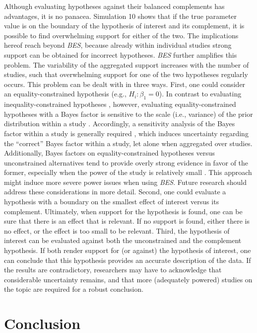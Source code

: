 \documentclass[
]{article}
\begin{document}
Although evaluating hypotheses against their balanced complements has
advantages, it is no panacea. Simulation 10 shows that if the true
parameter value is on the boundary of the hypothesis of interest and its
complement, it is possible to find overwhelming support for either of
the two. The implications hereof reach beyond \emph{BES}, because
already within individual studies strong support can be obtained for
incorrect hypotheses. \emph{BES} further amplifies this problem. The
variability of the aggregated support increases with the number of
studies, such that overwhelming support for one of the two hypotheses
regularly occurs. This problem can be dealt with in three ways. First,
one could consider an equality-constrained hypothesis (e.g.,
\(H_i: \beta_1=0\)). In contrast to evaluating inequality-constrained
hypotheses \citep{klugkist_bf_2007}, however, evaluating
equality-constrained hypotheses with a Bayes factor is sensitive to the
scale (i.e., variance) of the prior distribution within a study
\citep{hoijtink_prior_2021, tendeiro_kiers_2019}. Accordingly, a
sensitivity analysis of the Bayes factor within a study is generally
required \citep{hoijtink_prior_2021}, which induces uncertainty
regarding the ``correct'' Bayes factor within a study, let alone when
aggregated over studies. Additionally, Bayes factors on
equality-constrained hypotheses versus unconstrained alternatives tend
to provide overly strong evidence in favor of the former, especially
when the power of the study is relatively small
\citep[e.g.,][]{tendeiro_kiers_2019}. This approach might induce more
severe power issues when using \emph{BES}. Future research should
address these considerations in more detail. Second, one could evaluate
a hypothesis with a boundary on the smallest effect of interest
\citep{lakens2014performing} versus its complement. Ultimately, when
support for the hypothesis is found, one can be sure that there is an
effect that is relevant. If no support is found, either there is no
effect, or the effect is too small to be relevant. Third, the hypothesis
of interest can be evaluated against both the unconstrained and the
complement hypothesis. If both render support for (or against) the
hypothesis of interest, one can conclude that this hypothesis provides
an accurate description of the data. If the results are contradictory,
researchers may have to acknowledge that considerable uncertainty
remains, and that more (adequately powered) studies on the topic are
required for a robust conclusion.

\hypertarget{conclusion}{%
\section{Conclusion}\label{conclusion}}
\end{document}
